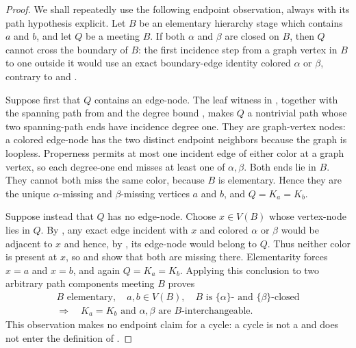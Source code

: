 \begin{proof}
We shall repeatedly use the following endpoint observation, always with
its path hypothesis explicit.  Let $B$ be an elementary hierarchy stage
which contains $a$ and $b$, and let $Q$ be a
 meeting $B$.  If both $\alpha$ and
$\beta$ are closed on $B$, then $Q$ cannot cross the boundary of $B$:
the first incidence step from a graph vertex in $B$ to one outside it
would use an exact boundary-edge identity colored $\alpha$ or $\beta$,
contrary to  and
.

Suppose first that $Q$ contains an edge-node.  The leaf witness in
, together with the spanning path from
 and the degree bound
, makes $Q$ a nontrivial path
whose two spanning-path ends have incidence degree one.  They are
graph-vertex nodes: a colored edge-node has the two distinct endpoint
neighbors because the graph is loopless.  Properness permits at most one
incident edge of either color at a graph vertex, so each degree-one end
misses at least one of $\alpha,\beta$.  Both ends lie in $B$.  They cannot
both miss the same color, because $B$ is elementary.  Hence they are the
unique $\alpha$-missing and $\beta$-missing vertices $a$ and $b$, and
$Q=K_a=K_b$.

Suppose instead that $Q$ has no edge-node.  Choose $x\in V(B)$ whose
vertex-node lies in $Q$.  By , any exact
edge incident with $x$ and colored $\alpha$ or $\beta$ would be adjacent
to $x$ and hence, by , its edge-node would
belong to $Q$.  Thus neither color is present at $x$, so
 and  show that both are
missing there.  Elementarity forces $x=a$ and $x=b$, and again
$Q=K_a=K_b$.  Applying this conclusion to two arbitrary path components
meeting $B$ proves
\[
 \begin{gathered}
 B\text{ elementary},\quad a,b\in V(B),\quad
 B\text{ is }\{\alpha\}\text{- and }\{\beta\}\text{-closed}\\
 \Longrightarrow\quad K_a=K_b\text{ and }\alpha,\beta
     \text{ are }B\text{-interchangeable}.
 \end{gathered}                                                         \tag{3}
\]
This observation makes no endpoint claim for a cycle: a cycle is not a
 and does not enter the definition of
.


\end{proof}
